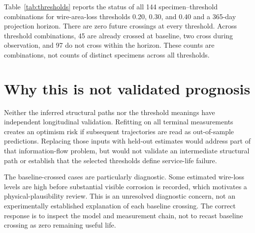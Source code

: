 Table~\ref{tab:thresholds} reports the status of all 144 specimen--threshold combinations for wire-area-loss thresholds 0.20, 0.30, and 0.40 and a 365-day projection horizon. There are zero future crossings at every threshold. Across threshold combinations, 45 are already crossed at baseline, two cross during observation, and 97 do not cross within the horizon. These counts are combinations, not counts of distinct specimens across all thresholds.
\begin{table}[htbp]\centering
\caption{Threshold status of model-derived wire-area-loss trajectories for 48 specimens per threshold. Values are counts, not measured failures. Thresholds are fractions expressed here as percentages. ``Not crossed'' means within the configured 365-day projection horizon; the term does not imply a validated survival observation. Future crossing count is zero at all thresholds.}\label{tab:thresholds}

\end{table}

\section{Why this is not validated prognosis}
Neither the inferred structural paths nor the threshold meanings have independent longitudinal validation. Refitting on all terminal measurements creates an optimism risk if subsequent trajectories are read as out-of-sample predictions. Replacing those inputs with held-out estimates would address part of that information-flow problem, but would not validate an intermediate structural path or establish that the selected thresholds define service-life failure.

The baseline-crossed cases are particularly diagnostic. Some estimated wire-loss levels are high before substantial visible corrosion is recorded, which motivates a physical-plausibility review. This is an unresolved diagnostic concern, not an experimentally established explanation of each baseline crossing. The correct response is to inspect the model and measurement chain, not to recast baseline crossing as zero remaining useful life.

